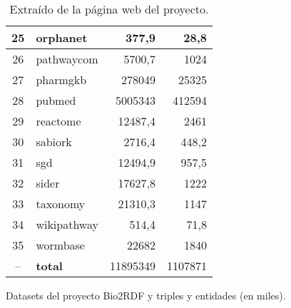 \begin{table}[htpb]
\begin{tabular}{|c|l|r|r|}
  25 & orphanet    &    377,9 &    28,8\\\hline
  26 & pathwaycom  &   5700,7 &    1024\\\hline
  27 & pharmgkb    &   278049 &   25325\\\hline
  28 & pubmed      &  5005343 &  412594\\\hline
  29 & reactome    &  12487,4 &    2461\\\hline
  30 & sabiork     &   2716,4 &   448,2\\\hline
  31 & sgd         &  12494,9 &   957,5\\\hline
  32 & sider       &  17627,8 &    1222\\\hline
  33 & taxonomy    &  21310,3 &    1147\\\hline
  34 & wikipathway &    514,4 &    71,8\\\hline
  35 & wormbase    &    22682 &    1840\\\hline
  -- & \bf{total}  & 11895349 & 1107871\\\hline
\end{tabular}
\caption{Datasets del proyecto Bio2RDF y triples y entidades (en miles).}
\vspace{-.2cm}
\caption*{
  Extraído de la página web del proyecto.
}
\label{tab:bio2RDFdataset}
\end{table}
